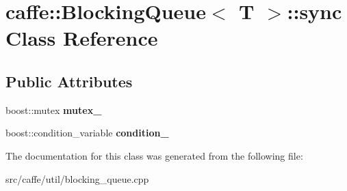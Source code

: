 \hypertarget{classcaffe_1_1_blocking_queue_1_1sync}{}\section{caffe\+:\+:Blocking\+Queue$<$ T $>$\+:\+:sync Class Reference}
\label{classcaffe_1_1_blocking_queue_1_1sync}
\subsection*{Public Attributes}
\begin{DoxyCompactItemize}
\item 
\mbox{\label{classcaffe_1_1_blocking_queue_1_1sync_a48aa36f6e5c832e279495cc9a818221a}} 
boost\+::mutex {\bfseries mutex\+\_\+}
\item 
\mbox{\label{classcaffe_1_1_blocking_queue_1_1sync_acb03aa4056b30fc66cef29872314d63b}} 
boost\+::condition\+\_\+variable {\bfseries condition\+\_\+}
\end{DoxyCompactItemize}


The documentation for this class was generated from the following file\+:\begin{DoxyCompactItemize}
\item 
src/caffe/util/blocking\+\_\+queue.\+cpp\end{DoxyCompactItemize}
